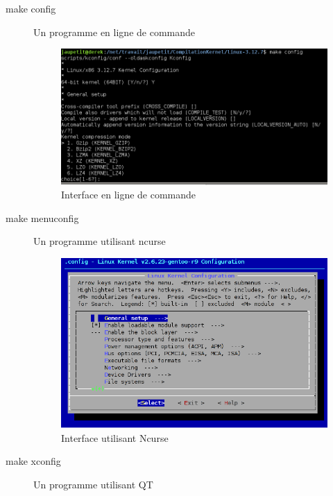 \documentclass[16pts]{report}
\begin{document}
\begin{description}
\item[make config]              Un programme en ligne de commande \\
        \begin{figure}[H]
            \includegraphics[scale=0.7]{illustrations/configLine.png}
            \centering
            \caption{Interface en ligne de commande}
            \label{fig:MakeConfig}
        \end{figure}
        \pagebreak
    \item[make menuconfig]      Un programme utilisant ncurse \\
        \begin{figure}[H]
            \includegraphics[scale=0.7]{illustrations/menuconfig.png}
            \centering
            \caption{Interface utilisant Ncurse}
            \label{fig:MakeMenuConfig}
        \end{figure}
\item[make xconfig]             Un programme utilisant QT \\
        \begin{figure}[H]

\end{figure}
\end{description}
\end{document}
